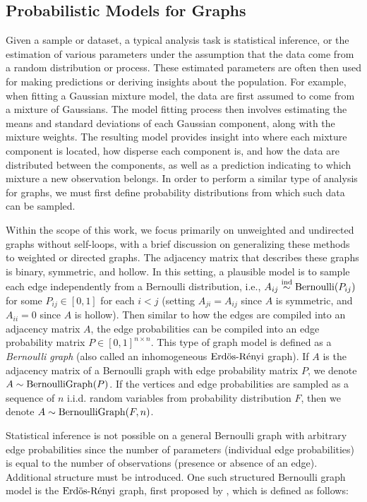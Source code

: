\documentclass[
  11pt,
]{article}
\theoremstyle{definition}
\theoremstyle{definition}
\theoremstyle{definition}
\theoremstyle{definition}
\theoremstyle{remark}
\begin{document}
\hypertarget{probabilistic-models-for-graphs}{%
\subsection{Probabilistic Models for Graphs}\label{probabilistic-models-for-graphs}}

Given a sample or dataset, a typical analysis task is statistical inference, or the estimation of various parameters under the assumption that the data come from a random distribution or process.
These estimated parameters are often then used for making predictions or deriving insights about the population.
For example, when fitting a Gaussian mixture model, the data are first assumed to come from a mixture of Gaussians.
The model fitting process then involves estimating the means and standard deviations of each Gaussian component, along with the mixture weights.
The resulting model provides insight into where each mixture component is located, how disperse each component is, and how the data are distributed between the components, as well as a prediction indicating to which mixture a new observation belongs.
In order to perform a similar type of analysis for graphs, we must first define probability distributions from which such data can be sampled.

Within the scope of this work, we focus primarily on unweighted and undirected graphs without self-loops, with a brief discussion on generalizing these methods to weighted or directed graphs.
The adjacency matrix that describes these graphs is binary, symmetric, and hollow.
In this setting, a plausible model is to sample each edge independently from a Bernoulli distribution, i.e., \(A_{ij} \stackrel{\mathrm{ind}}{\sim} \mathrm{Bernoulli}(P_{ij})\) for some \(P_{ij} \in [0, 1]\) for each \(i < j\) (setting \(A_{ji} = A_{ij}\) since \(A\) is symmetric, and \(A_{ii} = 0\) since \(A\) is hollow).
Then similar to how the edges are compiled into an adjacency matrix \(A\), the edge probabilities can be compiled into an edge probability matrix \(P \in [0, 1]^{n \times n}\).
This type of graph model is defined as a \emph{Bernoulli graph} (also called an inhomogeneous \(\text{Erd\"{o}s-R\'{e}nyi}\) graph).
If \(A\) is the adjacency matrix of a Bernoulli graph with edge probability matrix \(P\), we denote \(A \sim \mathrm{BernoulliGraph}(P)\).
If the vertices and edge probabilities are sampled as a sequence of \(n\) i.i.d. random variables from probability distribution \(F\), then we denote \(A \sim \mathrm{BernoulliGraph}(F, n)\).

Statistical inference is not possible on a general Bernoulli graph with arbitrary edge probabilities since the number of parameters (individual edge probabilities) is equal to the number of observations (presence or absence of an edge).
Additional structure must be introduced.
One such structured Bernoulli graph model is the \(\text{Erd\"{o}s-R\'{e}nyi}\) graph, first proposed by \cite{Gilbert:1959}, which is defined as follows:
\end{document}
